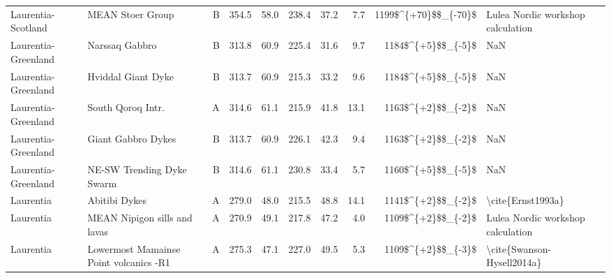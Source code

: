 \begin{longtable}{p{1 in}p{1 in}rrrrrrr}
            Laurentia-Scotland &                                   MEAN Stoer Group &      B &     354.5 &      58.0 & 238.4 &  37.2 &       7.7 &   1199\$\textasciicircum \{+70\}\$\$\_\{-70\}\$ &                  Lulea Nordic workshop calculation \\
           Laurentia-Greenland &                                     Narssaq Gabbro &      B &     313.8 &      60.9 & 225.4 &  31.6 &       9.7 &     1184\$\textasciicircum \{+5\}\$\$\_\{-5\}\$ &                                                NaN \\
           Laurentia-Greenland &                                 Hviddal Giant Dyke &      B &     313.7 &      60.9 & 215.3 &  33.2 &       9.6 &     1184\$\textasciicircum \{+5\}\$\$\_\{-5\}\$ &                                                NaN \\
           Laurentia-Greenland &                                  South Qoroq Intr. &      A &     314.6 &      61.1 & 215.9 &  41.8 &      13.1 &     1163\$\textasciicircum \{+2\}\$\$\_\{-2\}\$ &                                                NaN \\
           Laurentia-Greenland &                                 Giant Gabbro Dykes &      B &     313.7 &      60.9 & 226.1 &  42.3 &       9.4 &     1163\$\textasciicircum \{+2\}\$\$\_\{-2\}\$ &                                                NaN \\
           Laurentia-Greenland &                          NE-SW Trending Dyke Swarm &      B &     314.6 &      61.1 & 230.8 &  33.4 &       5.7 &     1160\$\textasciicircum \{+5\}\$\$\_\{-5\}\$ &                                                NaN \\
                     Laurentia &                                      Abitibi Dykes &      A &     279.0 &      48.0 & 215.5 &  48.8 &      14.1 &     1141\$\textasciicircum \{+2\}\$\$\_\{-2\}\$ &                                  \textbackslash cite\{Ernst1993a\} \\
                     Laurentia &                       MEAN Nipigon sills and lavas &      A &     270.9 &      49.1 & 217.8 &  47.2 &       4.0 &     1109\$\textasciicircum \{+2\}\$\$\_\{-2\}\$ &                  Lulea Nordic workshop calculation \\
                     Laurentia &             Lowermost Mamainse Point volcanics -R1 &      A &     275.3 &      47.1 & 227.0 &  49.5 &       5.3 &     1109\$\textasciicircum \{+2\}\$\$\_\{-3\}\$ &                         \textbackslash cite\{Swanson-Hysell2014a\} \\

\end{longtable}
